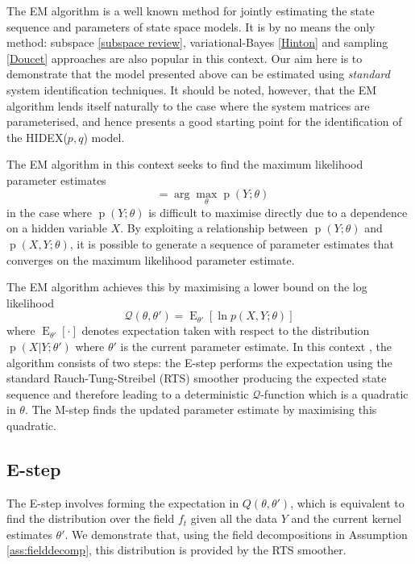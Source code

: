 \documentclass{IEEEtran}
\DeclareMathOperator{\E}{E}
\DeclareMathOperator{\p}{p}
\DeclareMathOperator{\thetaML}{\theta_{\mathrm{ML}}}
\begin{document}
The EM algorithm is a well known method for jointly estimating the state sequence and parameters of state space models. It is by no means the only method: subspace \ref{subspace review}, variational-Bayes \ref{Hinton} and sampling \ref{Doucet} approaches are also popular in this context. Our aim here is to demonstrate that the model presented above can be estimated using \emph{standard} system identification techniques. It should be noted, however, that the EM algorithm lends itself naturally to the case where the system matrices are parameterised, and hence presents a good starting point for the identification of the HIDEX($p,q$) model.

The EM algorithm in this context seeks to find the maximum likelihood parameter estimates 
\begin{equation}
\thetaML=\arg\max_{\theta} \p (Y ; \theta)
\end{equation}
in the case where $\p(Y;\theta)$ is difficult to maximise directly due to a dependence on a hidden variable $X$. By exploiting a relationship between $\p(Y; \theta)$ and $\p(X,Y; \theta)$, it is possible to generate a sequence of parameter estimates that converges on the maximum likelihood parameter estimate.

The EM algorithm achieves this by maximising a lower bound on the log likelihood
\begin{equation}
	\mathcal{Q}(\theta,\theta')=\E_{\theta'}\left[\ln p(X,Y;\theta)\right]
\end{equation}
where $\E_{\theta'}[\cdot]$ denotes expectation taken with respect to the distribution $\p(X|Y ; \theta')$ where $\theta'$ is the current parameter estimate. In this context \cite{Gibson05}, the algorithm consists of two steps: the E-step performs the expectation using the standard Rauch-Tung-Streibel (RTS) smoother \cite{Rauch65} producing the expected state sequence and therefore leading to a deterministic $\mathcal{Q}$-function which is a quadratic in $\theta$. The M-step finds the updated parameter estimate by maximising this quadratic.

\subsection{E-step}

The E-step involves forming the expectation in $Q(\theta,\theta')$, which is equivalent to find the distribution over the field $f_t$ given all the data $Y$ and the current kernel estimates $\theta'$. We demonstrate that, using the field decompositions in Assumption \ref{ass:fielddecomp}, this distribution is provided by the RTS smoother. 
\end{document}
